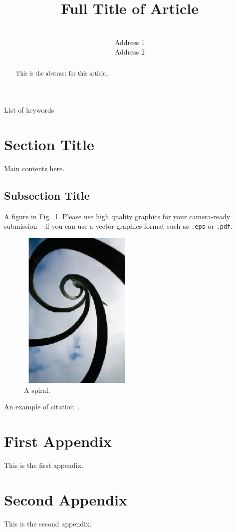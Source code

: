 \documentclass[wcp]{jmlr}
\title[Short Title]{Full Title of Article}
\author{\Name{Author Name1} \Email{abc@sample.com}\\
  \addr Address 1
  \AND
  \Name{Author Name2} \Email{xyz@sample.com}\\
  \addr Address 2
 }
\begin{document}
\maketitle

\begin{abstract}
This is the abstract for this article.
\end{abstract}
\begin{keywords}
List of keywords
\end{keywords}

\section{Section Title}
Main contents here.

\subsection{Subsection Title}
A figure in Fig.~\ref{fig:spiral}. Please use high quality graphics for your camera-ready submission -- if you can use a vector graphics format such as \texttt{.eps} or \texttt{.pdf}.
\begin{figure}[htp]
\begin{center}
\includegraphics[width=0.5\textwidth]{spiral.eps}
\caption{A spiral.}\label{fig:spiral}
\end{center}
\end{figure}

An example of citation~\cite{DBLP:conf/acml/2009}.


%


\appendix

\section{First Appendix}\label{apd:first}

This is the first appendix.

\section{Second Appendix}\label{apd:second}

This is the second appendix.
\end{document}
